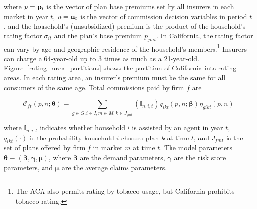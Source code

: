 \documentclass[12pt]{article}
\begin{document}
\doublespacing

\noindent where $\textit{p} = {\bf p}_t$ is the vector of plan base premiums set by all insurers in each market in year $t$, $\textit{n} = {\bf n}_t$ is the vector of commission decision variables in period $t$, and the household's (unsubsidized) premium is the product of the household's rating factor $\sigma_{it}$  and the plan's base premium $p_{jmt}$. In California, the rating factor can vary by age and geographic residence of the household's members.\footnote{The ACA also permits rating by tobacco usage, but California prohibits tobacco rating.}  Insurers can charge a 64-year-old up to 3 times as much as a 21-year-old. Figure~\ref{rating_area_partitions} shows the partition of California into rating areas.  In each rating area,  an insurer's premium must be the same for all consumers of the same age. Total commissions paid by firm $f$  are		
	
	\vspace{-0.2in}		
	
		$$
		\mathcal{C}_{ft}(\textit{p},\textit{n};\boldsymbol{\theta}) = \sum_{g \in G, i \in I, m\in M, k \in J_{fmt}} \left( \mathbb{I}_{n,i,t} \right)  q_{ikt}(\textit{p},\textit{n};\boldsymbol{\beta}) \eta_{gikt}(\textit{p},\textit{n})
		$$	
	
\noindent where $\mathbb{I}_{n,i,t}$ indicates whether household $i$ is assisted by an agent in year $t$, $q_{ikt}(\cdot)$ is the probability household $i$ chooses plan $k$ at time $t$, and $J_{fmt}$ is the set of plans offered by firm $f$ in market $m$ at time $t$.  The model parameters $\boldsymbol{\theta} \equiv (\boldsymbol{\beta},\boldsymbol{\gamma},\boldsymbol{\mu})$, where $\boldsymbol{\beta}$ are the demand parameters, $\boldsymbol{\gamma}$ are the risk score parameters, and $\boldsymbol{\mu}$ are the average claims parameters.
\end{document}
